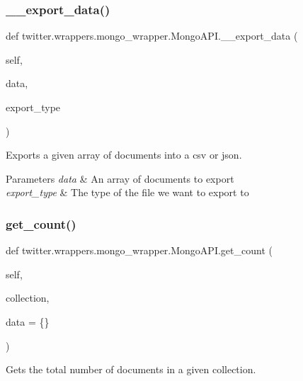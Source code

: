 \subsubsection{\texorpdfstring{\+\_\+\+\_\+export\+\_\+data()}{\_\_export\_data()}}
{\footnotesize\ttfamily def twitter.\+wrappers.\+mongo\+\_\+wrapper.\+Mongo\+A\+P\+I.\+\_\+\+\_\+export\+\_\+data (\begin{DoxyParamCaption}\item[{}]{self,  }\item[{}]{data,  }\item[{}]{export\+\_\+type }\end{DoxyParamCaption})\hspace{0.3cm}{\ttfamily [private]}}



Exports a given array of documents into a csv or json. 


\begin{DoxyParams}{Parameters}
{\em data} & An array of documents to export \\
\hline
{\em export\+\_\+type} & The type of the file we want to export to \\
\hline
\end{DoxyParams}
\mbox{\label{classtwitter_1_1wrappers_1_1mongo__wrapper_1_1MongoAPI_a7c5d38f4ab2e2680224d47278b01d3bb}} 
\subsubsection{\texorpdfstring{get\+\_\+count()}{get\_count()}}
{\footnotesize\ttfamily def twitter.\+wrappers.\+mongo\+\_\+wrapper.\+Mongo\+A\+P\+I.\+get\+\_\+count (\begin{DoxyParamCaption}\item[{}]{self,  }\item[{}]{collection,  }\item[{}]{data = {\ttfamily \{\}} }\end{DoxyParamCaption})}



Gets the total number of documents in a given collection. 


